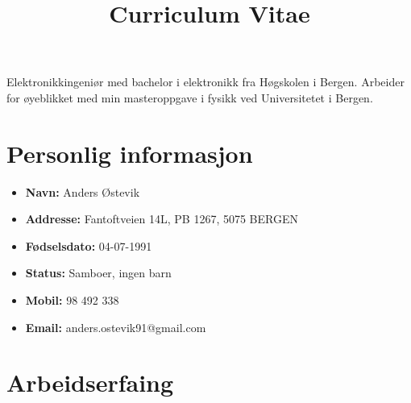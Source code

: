 \documentclass[11pt,a4paper,sans, norsk]{moderncv}        %
\title{Curriculum Vitae}                               %
\begin{document}
\makecvtitle

\small{Elektronikkingeniør med bachelor i elektronikk fra Høgskolen i Bergen. Arbeider for øyeblikket med min masteroppgave i fysikk ved Universitetet i Bergen.}

\section{Personlig informasjon}

{\renewcommand\labelitemi{}
\begin{itemize}

\item{\textbf{Navn:}	Anders Østevik}
\vspace{3pt}
\item{\textbf{Addresse:}	Fantoftveien 14L, PB 1267, 5075 BERGEN}
\vspace{3pt}
\item{\textbf{Fødselsdato:}	04-07-1991}
\vspace{3pt}
\item{\textbf{Status:}	Samboer, ingen barn}
\vspace{3pt}
\item{\textbf{Mobil:}	98 492 338}
\vspace{3pt}
\item{\textbf{Email:}	anders.ostevik91@gmail.com}

\vspace{6pt}

\end{itemize}
}

\section{Arbeidserfaing}

\vspace{6pt}
\end{document}

